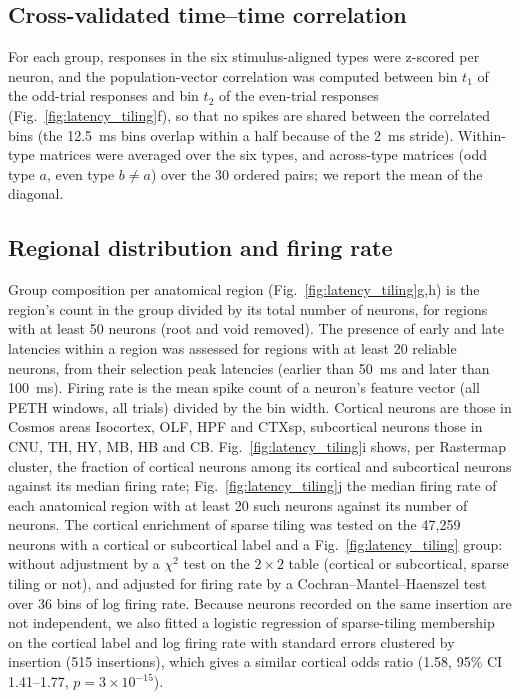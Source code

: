 \documentclass[10pt,lineno]{elife}
\begin{document}
\subsection{Cross-validated time--time correlation}
For each group, responses in the six stimulus-aligned types were z-scored per neuron, and the population-vector correlation was computed between bin $t_1$ of the odd-trial responses and bin $t_2$ of the even-trial responses (Fig.~\ref{fig:latency_tiling}f), so that no spikes are shared between the correlated bins (the 12.5~ms bins overlap within a half because of the 2~ms stride). Within-type matrices were averaged over the six types, and across-type matrices (odd type $a$, even type $b\neq a$) over the 30 ordered pairs; we report the mean of the diagonal.

\subsection{Regional distribution and firing rate}
Group composition per anatomical region (Fig.~\ref{fig:latency_tiling}g,h) is the region's count in the group divided by its total number of neurons, for regions with at least 50 neurons (root and void removed). The presence of early and late latencies within a region was assessed for regions with at least 20 reliable neurons, from their selection peak latencies (earlier than 50~ms and later than 100~ms). Firing rate is the mean spike count of a neuron's feature vector (all PETH windows, all trials) divided by the bin width. Cortical neurons are those in Cosmos areas Isocortex, OLF, HPF and CTXsp, subcortical neurons those in CNU, TH, HY, MB, HB and CB. Fig.~\ref{fig:latency_tiling}i shows, per Rastermap cluster, the fraction of cortical neurons among its cortical and subcortical neurons against its median firing rate; Fig.~\ref{fig:latency_tiling}j the median firing rate of each anatomical region with at least 20 such neurons against its number of neurons. The cortical enrichment of sparse tiling was tested on the 47,259 neurons with a cortical or subcortical label and a Fig.~\ref{fig:latency_tiling} group: without adjustment by a $\chi^2$ test on the $2\times2$ table (cortical or subcortical, sparse tiling or not), and adjusted for firing rate by a Cochran--Mantel--Haenszel test over 36 bins of log firing rate. Because neurons recorded on the same insertion are not independent, we also fitted a logistic regression of sparse-tiling membership on the cortical label and log firing rate with standard errors clustered by insertion (515 insertions), which gives a similar cortical odds ratio (1.58, 95\% CI 1.41--1.77, $p=3\times10^{-15}$).
\end{document}
